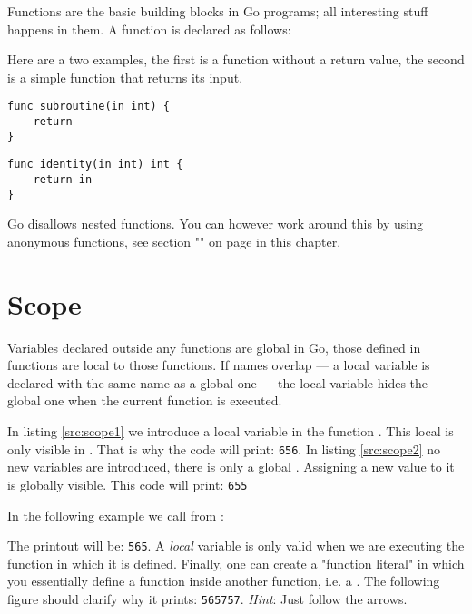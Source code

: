 
\noindent{}Functions are the basic building blocks in Go programs; all interesting
stuff happens in them. A function is declared as follows:

\showremarks
Here are a two examples, the first is a function without a return value,
the second is a simple function that returns its input.
\begin{lstlisting}
func subroutine(in int) {
    return
}
\end{lstlisting}
\begin{lstlisting}
func identity(in int) int {
    return in
}
\end{lstlisting}
Go disallows nested functions.
You can however
work around this by using anonymous functions, see section
"" on page \pageref{sec:functions as values} 
in this chapter.

\section{Scope}
Variables declared outside any functions are global in Go, those
defined in functions are local to those functions. If names overlap --- a
local variable is declared with the same name as a global one --- the
local variable hides the global one when the current function is
executed.

\begin{minipage}{.5\textwidth}

\hfill
\vfill
\end{minipage}
\begin{minipage}{.5\textwidth}

\hfill
\vfill
\end{minipage}

In listing \ref{src:scope1} we introduce a local variable 
in the function .
This local  is only visible in . That is
why the code will print: \texttt{656}.
In listing \ref{src:scope2} no new variables are introduced, there
is only a global .
Assigning a new value to it is globally visible. This code will
print: \texttt{655}

In the following example we call  from :

The printout will be: \texttt{565}. A \emph{local} variable is only
valid when we are executing the function in which it is defined. 
Finally, one can create
a "function
literal" in which you essentially define a function inside another
function, i.e. a . 
The following figure should clarify why it
prints: \texttt{565757}. \emph{Hint}: Just follow the arrows.

